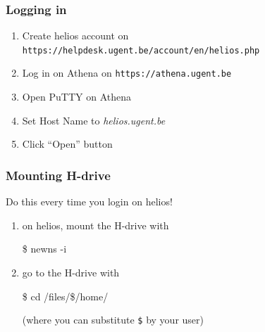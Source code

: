 \documentclass[aspectratio=43,9pt]{beamer}
\begin{document}
%
%
\begin{frame}
	\frametitle{Logging in}
	\begin{enumerate}
		\item Create helios account on \texttt{https://helpdesk.ugent.be/account/en/helios.php}\vspace*{2ex}
		\item Log in on Athena on \texttt{https://athena.ugent.be}\vspace*{2ex}
		\item Open PuTTY on Athena\vspace*{2ex}
		\item Set Host Name to \emph{helios.ugent.be}\vspace*{2ex}
		\item Click ``Open'' button
	\end{enumerate}
\end{frame}
%
%
\begin{frame}
	\frametitle{Mounting H-drive}
	Do this every time you login on helios!\vspace*{4ex}
	\begin{enumerate}
		\item on helios, mount the H-drive with
			\par\vspace*{1ex}\hspace*{.05\textwidth}\parbox{.5\textwidth}{\ttfamily
		   \$   newns  -i
			}\vspace*{1ex}\par\vspace*{2ex}
		\item go to the H-drive with
			\par\vspace*{1ex}\hspace*{.05\textwidth}\parbox{.5\textwidth}{\ttfamily
		   \$   cd  /files/\$/home/
			}\vspace*{1ex}\par
			(where you can substitute \texttt{\$} by your user)
	\end{enumerate}
\end{frame}
%
%
\end{document}
